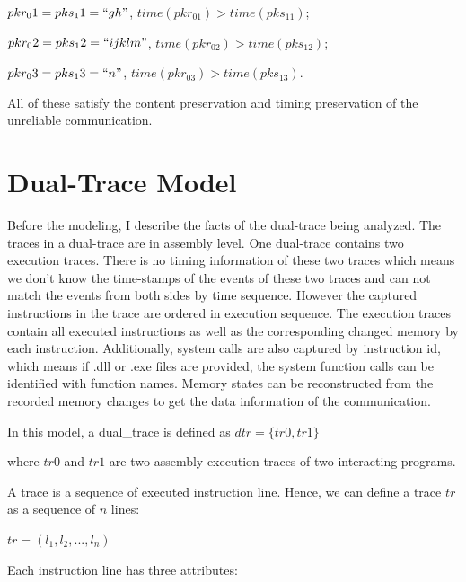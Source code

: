 $pkr_01 = pks_11=``gh"$, $time(pkr_01) > time(pks_11)$;

$pkr_02 = pks_12=``ijklm"$, $time(pkr_02) > time(pks_12)$;

$pkr_03 = pks_13=``n"$, $time(pkr_03) > time(pks_13)$.

All of these satisfy the content preservation and timing preservation of the unreliable communication.


\section{Dual-Trace Model}
Before the modeling, I describe the facts of the dual-trace being analyzed. The traces in a dual-trace are in assembly level. One dual-trace contains two execution traces. There is no timing information of these two traces which means we don't know the time-stamps of the events of these two traces and can not match the events from both sides by time sequence. However the captured instructions in the trace are ordered in execution sequence. The execution traces contain all executed instructions as well as the corresponding changed memory by each instruction. Additionally, system calls are also captured by instruction id, which means if .dll or .exe files are provided, the system function calls can be identified with function names. Memory states can be reconstructed from the recorded memory changes to get the data information of the communication. 

In this model,  a dual\_trace is defined as $dtr = \lbrace tr0, tr1\rbrace$

where $tr0$ and $tr1$ are two assembly execution traces of two interacting programs.

A trace is a sequence of executed instruction line. Hence, we can define a trace $tr$ as a sequence of $n$ lines:

$ tr = (l_1, l_2, ..., l_n)$ 

Each instruction line has three attributes:

